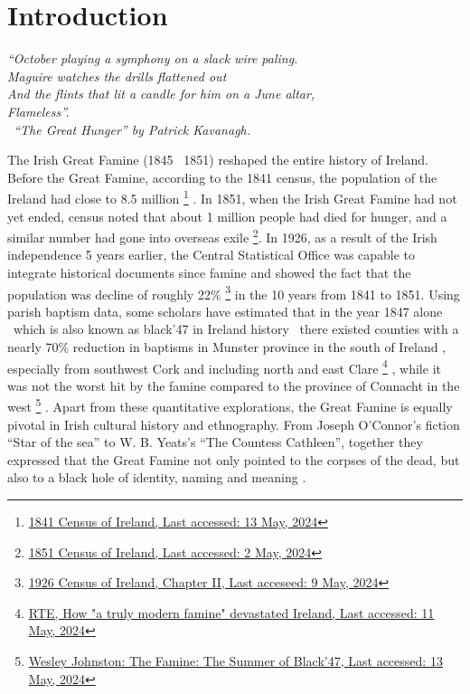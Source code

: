 \chapter{Introduction}
\textit{``October playing a symphony on a slack wire paling.\\
Maguire watches the drills flattened out\\
And the flints that lit a candle for him on a June altar,\\
Flameless''. \\
\textemdash\ ``The Great Hunger'' by Patrick Kavanagh.} \citep{Kavanagh_Quinn_2006a}
\vspace{.2cm}

The Irish Great Famine (1845 \textendash\ 1851) reshaped the entire history of Ireland. Before the Great Famine, according to the 1841 census, the population of the Ireland had close to 8.5 million
\footnote{
	\href{https://www.cso.ie/en/statistics/historicalreports/census1841/}{1841 Census of Ireland, Last accessed: 13 May, 2024}
}
. In 1851, when the Irish Great Famine had not yet ended, census noted that about 1 million people had died for hunger, and a similar number had gone into overseas exile
\footnote{
	\href{https://www.cso.ie/en/statistics/historicalreports/census1851/}{1851 Census of Ireland, Last accessed: 2 May, 2024}
}. In 1926, as a result of the Irish independence 5 years earlier, the Central Statistical Office was capable to integrate historical documents since famine and showed the fact that the population was decline of roughly 22\%
\footnote{
	\href{https://www.cso.ie/en/media/csoie/census/census1926results/volume10/C_1926_V10_Chapter_II.pdf}{1926 Census of Ireland, Chapter II, Last acceseed: 9 May, 2024}
} in the 10 years from 1841 to 1851. Using parish baptism data, some scholars have estimated that in the year 1847 alone \textendash\ which is also known as black'47 in Ireland history \textendash\ there existed counties with a nearly 70\% reduction in baptisms in Munster province in the south of Ireland \citep{cousens1960regional}, especially from southwest Cork and including north and east Clare
\footnote{
	\href{https://www.rte.ie/history/the-great-irish-famine/2020/0629/1150367-the-great-irish-famine/}{RTE, How "a truly modern famine" devastated Ireland, Last accessed: 11 May, 2024}
}
, while it was not the worst hit by the famine compared to the province of Connacht in the west
\footnote{
	\href{https://www.wesleyjohnston.com/users/ireland/past/famine/summer_1847.html}{Wesley Johnston: The Famine: The Summer of Black'47, Last accessed: 13 May, 2024}
}
. Apart from these quantitative explorations, the Great Famine is equally pivotal in Irish cultural history and ethnography. From Joseph O'Connor's fiction ``Star of the sea'' to W. B. Yeats's ``The Countess Cathleen'', together they expressed that the Great Famine not only pointed to the corpses of the dead, but also to a black hole of identity, naming and meaning \citep{luchen41naming}. 

